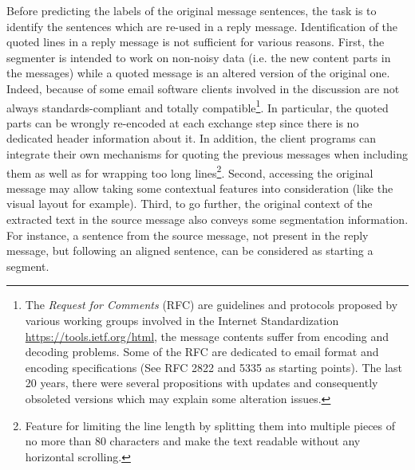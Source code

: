 Before predicting the labels of the original message sentences, the task is to identify the sentences which are re-used in a reply message. 
Identification of the quoted lines in a reply message is not sufficient for various reasons. 
%
First, the segmenter is intended to work on non-noisy data (i.e. the new content parts in the messages) while a quoted message is an altered version of the original one. 
Indeed, because of some email software clients involved in the discussion %
are not always standards-compliant and totally compatible\footnote{The \textit{Request for Comments} (RFC) are guidelines and protocols proposed by various working groups involved in the Internet Standardization \url{https://tools.ietf.org/html}, the message contents suffer from encoding and decoding problems. Some of the RFC are dedicated to email format and encoding specifications (See RFC 2822 and 5335 as starting points). The last 20 years, there were several propositions with updates and consequently obsoleted versions which may explain some alteration issues.}. 
In particular, the quoted parts can be wrongly re-encoded at each exchange step since there is no dedicated header information about it.
In addition, the client programs can
integrate their own mechanisms 
for quoting the previous messages when including them as well as 
for wrapping too long lines\footnote{Feature for limiting the line length by splitting them into multiple pieces of no more than 80 characters and make the text readable without any horizontal scrolling.}.
%
%
% 
%
Second, accessing the original message may allow taking some contextual features into consideration (like the visual layout for example). 
%
Third, to go further, the original context of the extracted text in the source message also conveys some segmentation information. For instance, a sentence from the source message, not present in the reply message, but following an aligned sentence, can be considered as starting a segment.


